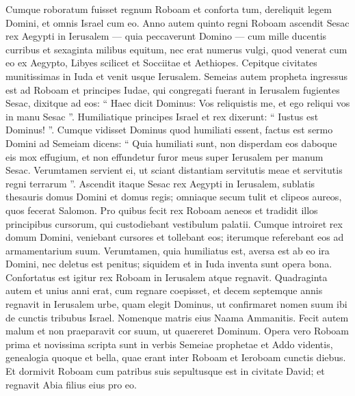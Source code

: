 \begin{biblechapter}
\begin{biblechapter}
\begin{biblechapter}
\begin{biblechapter}
\begin{biblechapter}
\begin{biblechapter}
\begin{biblechapter}
\begin{biblechapter}
\begin{biblechapter}
\begin{biblechapter}
\begin{biblechapter}
\begin{biblechapter}
\verse Cumque roboratum fuisset regnum Roboam et conforta tum, dereliquit legem Domini, et omnis Israel cum eo.
 \verse Anno autem quinto regni Roboam ascendit Sesac rex Aegypti in Ierusalem — quia peccaverunt Domino — 
\verse cum mille ducentis curribus et sexaginta milibus equitum, nec erat numerus vulgi, quod venerat cum eo ex Aegypto, Libyes scilicet et Socciitae et Aethiopes. 
\verse Cepitque civitates munitissimas in Iuda et venit usque Ierusalem.
 \verse Semeias autem propheta ingressus est ad Roboam et principes Iudae, qui congregati fuerant in Ierusalem fugientes Sesac, dixitque ad eos: “ Haec dicit Dominus: Vos reliquistis me, et ego reliqui vos in manu Sesac ”. 
\verse Humiliatique principes Israel et rex dixerunt: “ Iustus est Dominus! ”. 
\verse Cumque vidisset Dominus quod humiliati essent, factus est sermo Domini ad Semeiam dicens: “ Quia humiliati sunt, non disperdam eos daboque eis mox effugium, et non effundetur furor meus super Ierusalem per manum Sesac. 
\verse Verumtamen servient ei, ut sciant distantiam servitutis meae et servitutis regni terrarum ”.
 \verse Ascendit itaque Sesac rex Aegypti in Ierusalem, sublatis thesauris domus Domini et domus regis; omniaque secum tulit et clipeos aureos, quos fecerat Salomon. 
\verse Pro quibus fecit rex Roboam aeneos et tradidit illos principibus cursorum, qui custodiebant vestibulum palatii. 
\verse Cumque introiret rex domum Domini, veniebant cursores et tollebant eos; iterumque referebant eos ad armamentarium suum. 
\verse Verumtamen, quia humiliatus est, aversa est ab eo ira Domini, nec deletus est penitus; siquidem et in Iuda inventa sunt opera bona.
 \verse Confortatus est igitur rex Roboam in Ierusalem atque regnavit. Quadraginta autem et unius anni erat, cum regnare coepisset, et decem septemque annis regnavit in Ierusalem urbe, quam elegit Dominus, ut confirmaret nomen suum ibi de cunctis tribubus Israel. Nomenque matris eius Naama Ammanitis. 
\verse Fecit autem malum et non praeparavit cor suum, ut quaereret Dominum.
 \verse Opera vero Roboam prima et novissima scripta sunt in verbis Semeiae prophetae et Addo videntis, genealogia quoque et bella, quae erant inter Roboam et Ieroboam cunctis diebus. 
\verse Et dormivit Roboam cum patribus suis sepultusque est in civitate David; et regnavit Abia filius eius pro eo.
 

\end{biblechapter}
\end{biblechapter}
\end{biblechapter}
\end{biblechapter}
\end{biblechapter}
\end{biblechapter}
\end{biblechapter}
\end{biblechapter}
\end{biblechapter}
\end{biblechapter}
\end{biblechapter}
\end{biblechapter}
